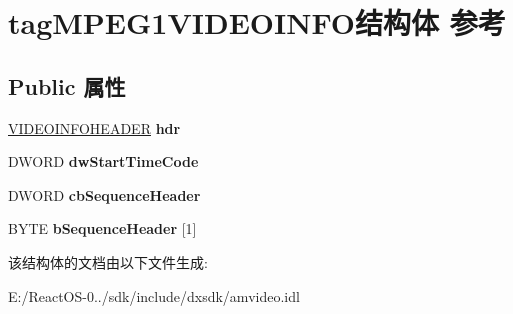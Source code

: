 \hypertarget{structtag_m_p_e_g1_v_i_d_e_o_i_n_f_o}{}\section{tag\+M\+P\+E\+G1\+V\+I\+D\+E\+O\+I\+N\+F\+O结构体 参考}
\label{structtag_m_p_e_g1_v_i_d_e_o_i_n_f_o}
\subsection*{Public 属性}
\begin{DoxyCompactItemize}
\item 
\mbox{\label{structtag_m_p_e_g1_v_i_d_e_o_i_n_f_o_afad53a207186cb94457eb96498a98274}} 
\hyperlink{structtag_v_i_d_e_o_i_n_f_o_h_e_a_d_e_r}{V\+I\+D\+E\+O\+I\+N\+F\+O\+H\+E\+A\+D\+ER} {\bfseries hdr}
\item 
\mbox{\label{structtag_m_p_e_g1_v_i_d_e_o_i_n_f_o_a371b541dd3ef01e4834693eb699ea6e4}} 
D\+W\+O\+RD {\bfseries dw\+Start\+Time\+Code}
\item 
\mbox{\label{structtag_m_p_e_g1_v_i_d_e_o_i_n_f_o_ad57745c2f1f028fc31b1414634e02d24}} 
D\+W\+O\+RD {\bfseries cb\+Sequence\+Header}
\item 
\mbox{\label{structtag_m_p_e_g1_v_i_d_e_o_i_n_f_o_ae4496af53947162feaba044f7ecab3c9}} 
B\+Y\+TE {\bfseries b\+Sequence\+Header} \mbox{[}1\mbox{]}
\end{DoxyCompactItemize}


该结构体的文档由以下文件生成\+:\begin{DoxyCompactItemize}
\item 
E\+:/\+React\+O\+S-\/0../sdk/include/dxsdk/amvideo.\+idl\end{DoxyCompactItemize}
